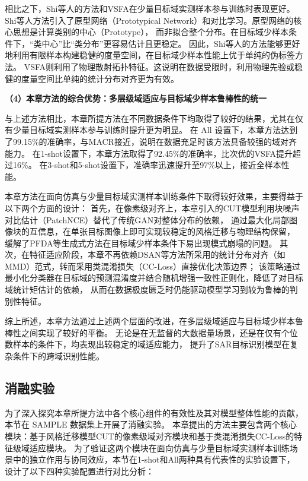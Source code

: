 相比之下，Shi等人的方法和VSFA在少量目标域实测样本参与训练时表现更好。
Shi等人方法引入了原型网络（Prototypical Network）和对比学习。原型网络的核心思想是计算类别的中心（Prototype），
而非拟合整个分布。在目标域少样本条件下，“类中心”比“类分布”更容易估计且更稳定。
因此，Shi等人的方法能够更好地利用有限样本构建稳健的度量空间，在目标域少样本性能上优于单纯的伪标签方法。
VSFA则利用了物理散射拓扑特征。这说明在数据受限时，利用物理先验或稳健的度量空间比单纯的统计分布对齐更为有效。

\textbf{（4）本章方法的综合优势：多层级域适应与目标域少样本鲁棒性的统一}

与上述方法相比，本章所提方法在不同数据条件下均取得了较好的结果，尤其在仅有少量目标域实测样本参与训练时提升更为明显。
在 All 设置下，本章方法达到了99.15\%的准确率，与MACR接近，说明在数据充足时该方法具备较强的域对齐能力。
在1-shot设置下，本章方法取得了92.45\%的准确率，比次优的VSFA提升超过16\%。
在3-shot和5-shot设置下，准确率迅速提升至97\%以上，接近全样本性能。

本章方法在面向仿真与少量目标域实测样本训练条件下取得较好效果，主要得益于以下两个方面的设计：
首先，在像素级对齐上，本章引入的CUT模型利用块噪声对比估计（PatchNCE）替代了传统GAN对整体分布的依赖，
通过最大化局部图像块的互信息，在单张目标图像上即可实现较稳定的风格迁移与物理结构保留，
缓解了PFDA等生成式方法在目标域少样本条件下易出现模式崩塌的问题。
其次，在特征适应阶段，本章不再依赖DSAN等方法所采用的统计分布对齐（如MMD）范式，转而采用类混淆损失（CC-Loss）直接优化决策边界；
该策略通过最小化分类器在目标域的预测混淆度并结合随机增强一致性正则化，降低了对目标域统计矩估计的依赖，
从而在数据极度匮乏时仍能驱动模型学习到较为鲁棒的判别性特征。

综上所述，本章方法通过上述两个层面的改进，在多层级域适应与目标域少样本鲁棒性之间实现了较好的平衡。
无论是在无监督的大数据量场景，还是在仅有个位数样本的条件下，均表现出较稳定的域适应能力，
提升了SAR目标识别模型在复杂条件下的跨域识别性能。


\subsection{消融实验}

为了深入探究本章所提方法中各个核心组件的有效性及其对模型整体性能的贡献，本节在 SAMPLE 数据集上开展了消融实验。
本章提出的方法主要包含两个核心模块：基于风格迁移模型CUT的像素级域对齐模块和基于类混淆损失CC-Loss的特征级域适应模块。
为了验证这两个模块在面向仿真与少量目标域实测样本训练场景中的独立作用与协同效应，本节在1-shot和All两种具有代表性的实验设置下，
设计了以下四种实验配置进行对比分析：


